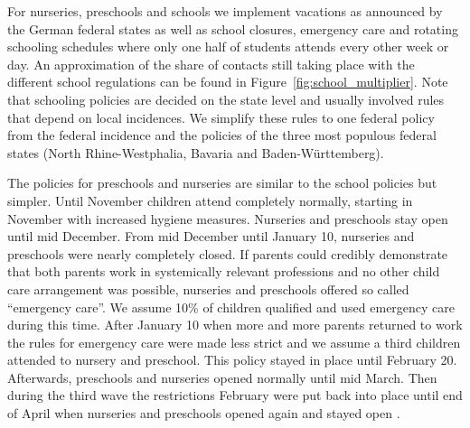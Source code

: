 
For nurseries, preschools and schools we implement vacations as announced by the German
federal states as well as school closures, emergency care and rotating schooling
schedules where only one half of students attends every other week or day. An
approximation of the share of contacts still taking place with the different school
regulations can be found in Figure~\ref{fig:school_multiplier}. Note that schooling
policies are decided on the state level and usually involved rules that depend on local
incidences. We simplify these rules to one federal policy from the federal incidence and
the policies of the three most populous federal states (North Rhine-Westphalia, Bavaria
and Baden-Württemberg).

The policies for preschools and nurseries are similar to the school policies but simpler.
Until November children attend completely normally, starting in November with increased
hygiene measures. Nurseries and preschools stay open until mid December. From mid
December until January 10, nurseries and preschools were nearly completely closed. If
parents could credibly demonstrate that both parents work in systemically relevant
professions and no other child care arrangement was possible, nurseries and preschools
offered so called ``emergency care''. We assume 10\% of children qualified and used
emergency care during this time. After January 10 when more and more parents returned to
work the rules for emergency care were made less strict and we assume a third children
attended to nursery and preschool. This policy stayed in place until February 20.
Afterwards, preschools and nurseries opened normally until mid March. Then during the
third wave the restrictions February were put back into place until end of April when
nurseries and preschools opened again and stayed open \citep{KiTa_BY, KiTa_NRW, KiTa_BW,
KiTa_BWa, KiTa_BYa}.

